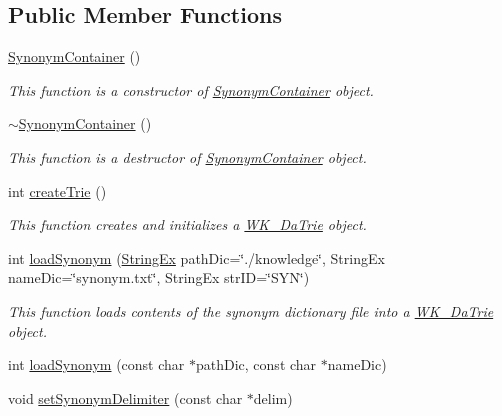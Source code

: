 \subsection*{Public Member Functions}
\begin{CompactItemize}
\item 
\hyperlink{classkmaOrange_1_1SynonymContainer_d093f6fd12aa4a2ce0e15f6ef481a65a}{SynonymContainer} ()
\begin{CompactList}\small\item\em This function is a constructor of \hyperlink{classkmaOrange_1_1SynonymContainer}{SynonymContainer} object. \item\end{CompactList}\item 
\hyperlink{classkmaOrange_1_1SynonymContainer_f65be98a8ceaad2fc15d556721b79518}{$\sim$SynonymContainer} ()
\begin{CompactList}\small\item\em This function is a destructor of \hyperlink{classkmaOrange_1_1SynonymContainer}{SynonymContainer} object. \item\end{CompactList}\item 
int \hyperlink{classkmaOrange_1_1SynonymContainer_2e4ae84b14cf54be1dca1af4525e0781}{createTrie} ()
\begin{CompactList}\small\item\em This function creates and initializes a \hyperlink{classkmaOrange_1_1WK__DaTrie}{WK\_\-DaTrie} object. \item\end{CompactList}\item 
int \hyperlink{classkmaOrange_1_1SynonymContainer_1d9f423be46ace7cad7a195ec33f7fac}{loadSynonym} (\hyperlink{classStringEx}{StringEx} pathDic=\char`\"{}./knowledge\char`\"{}, StringEx nameDic=\char`\"{}synonym.txt\char`\"{}, StringEx strID=\char`\"{}SYN\char`\"{})
\begin{CompactList}\small\item\em This function loads contents of the synonym dictionary file into a \hyperlink{classkmaOrange_1_1WK__DaTrie}{WK\_\-DaTrie} object. \item\end{CompactList}\item 
int \hyperlink{classkmaOrange_1_1SynonymContainer_8459ec6b5a2d9c1b5313db22be6b65e4}{loadSynonym} (const char $\ast$pathDic, const char $\ast$nameDic)
\item 
void \hyperlink{classkmaOrange_1_1SynonymContainer_01bb87b5ceba481163ea282a459694f5}{setSynonymDelimiter} (const char $\ast$delim)

\end{CompactItemize}
